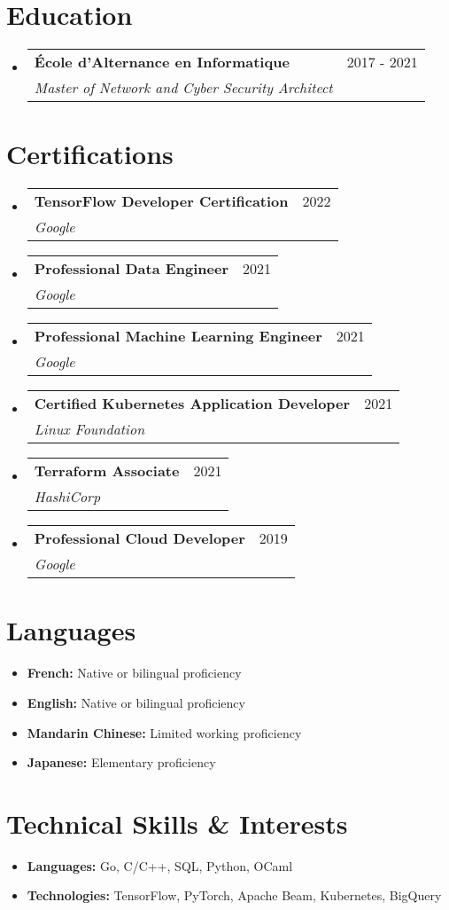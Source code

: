 \documentclass[letterpaper,11pt]{article}
\makeatletter
\newcommand{\resumeItem}[1]{
  \item\small{#1 \vspace{-2pt}}
}
\newcommand{\resumeSubheading}[3]{
  \vspace{-1pt}\item
    \begin{tabular*}{0.97\textwidth}[t]{l@{\extracolsep{\fill}}r}
      \textbf{#1} & #2 \\
      \textit{\small #3} \\
    \end{tabular*}\vspace{-5pt}
}
\newcommand{\resumeSubHeadingListStart}{\begin{itemize}[leftmargin=*]}
\newcommand{\resumeSubHeadingListEnd}{\end{itemize}}
\makeatother
\begin{document}
\section{Education}
\resumeSubHeadingListStart{}
\resumeSubheading{École d'Alternance en Informatique}
{2017 - 2021}
{Master of Network and Cyber Security Architect}
\resumeSubHeadingListEnd{}


\section{Certifications}
\resumeSubHeadingListStart{}
\resumeSubheading{TensorFlow Developer Certification}
{2022}
{Google}
\resumeSubheading{Professional Data Engineer}
{2021}
{Google}
\resumeSubheading{Professional Machine Learning Engineer}
{2021}
{Google}
\resumeSubheading{Certified Kubernetes Application Developer}
{2021}
{Linux Foundation}
\resumeSubheading{Terraform Associate}
{2021}
{HashiCorp}
\resumeSubheading{Professional Cloud Developer}
{2019}
{Google}
\resumeSubHeadingListEnd{}


\section{Languages}
\resumeSubHeadingListStart{}
\resumeItem{
	\textbf{French:}{
		Native or bilingual proficiency
	}
}
\resumeItem{
	\textbf{English:}{
		Native or bilingual proficiency
	}
}
\resumeItem{
	\textbf{Mandarin Chinese:}{
		Limited working proficiency
	}
}
\resumeItem{
	\textbf{Japanese:}{
		Elementary proficiency
	}
}
\resumeSubHeadingListEnd{}


\section{Technical Skills \& Interests}
\resumeSubHeadingListStart{}
\resumeItem{
	\textbf{Languages:}{
		Go, C/C++, SQL, Python, OCaml
	}
}
\resumeItem{
	\textbf{Technologies:}{
		TensorFlow, PyTorch, Apache Beam, Kubernetes, BigQuery
	}
}
\resumeSubHeadingListEnd{}
\end{document}
